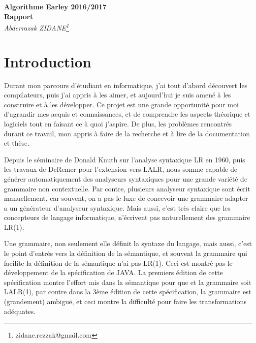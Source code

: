 \documentclass[10pt]{report}
\begin{document}
\begin{titlepage}
   \begin{center}
   	  \Large\textbf{Algorithme Earley 2016/2017}\\
      \Large\textbf{Rapport}\\
      \large\textit{Abderrazak ZIDANE\footnote{zidane.rezzak@gmail.com}}
   \end{center}
\end{titlepage}

\chapter{Introduction}
Durant mon parcours d'étudiant en informatique, j'ai tout d'abord découvert les compilateurs, puis j'ai appris à les aimer, et aujourd'hui je suis amené à les construire et à les développer. Ce projet est une grande opportunité pour moi d'agrandir mes acquis et connaissances, et de comprendre les aspects théorique et logiciels tout en faisant ce à quoi j'aspire. De plus, les problèmes rencontrés durant ce travail, mon appris à faire de la recherche et à lire de la documentation et thèse.

Depuis le séminaire de Donald Knuth\cite{Knuth} sur l'analyse syntaxique LR en 1960, puis les travaux de DeRemer\cite{DeRemer01, DeRemer02} pour l'extension vers LALR, nous somme capable de générer automatiquement des analyseurs syntaxiques pour une grande variété de grammaire non contextuelle. Par contre, plusieurs analyseur syntaxique sont écrit manuellement, car souvent, on a pas le luxe de concevoir une grammaire adapter a un générateur d'analyseur syntaxique. Mais aussi, c'est très claire que les concepteurs de langage informatique, n'écrivent pas naturellement des grammaire LR(1).

Une grammaire, non seulement elle définit la syntaxe du langage, mais aussi, c'est le point d'entrés vers la définition de la sémantique, et souvent la grammaire qui facilite la définition de la sémantique n'ai pas LR(1). Ceci est montré pas le développement de la spécification de JAVA. La premiers édition de cette spécification\cite{Java01} montre l'effort mis dans la sémantique pour que et la grammaire soit LALR(1), par contre dans la 3ème édition de cette spécification\cite{Java02}, la grammaire est (grandement) ambiguë, et ceci montre la difficulté pour faire les transformations adéquates. 
\end{document}
